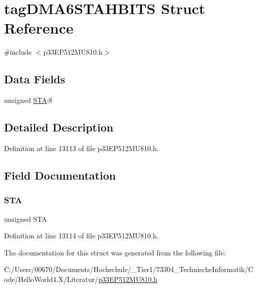 \hypertarget{structtag_d_m_a6_s_t_a_h_b_i_t_s}{}\section{tag\+D\+M\+A6\+S\+T\+A\+H\+B\+I\+TS Struct Reference}
\label{structtag_d_m_a6_s_t_a_h_b_i_t_s}


{\ttfamily \#include $<$p33\+E\+P512\+M\+U810.\+h$>$}

\subsection*{Data Fields}
\begin{DoxyCompactItemize}
\item 
unsigned \hyperlink{structtag_d_m_a6_s_t_a_h_b_i_t_s_a0eec78ddd2c12af678d5fab70fe62d14}{S\+TA}\+:8
\end{DoxyCompactItemize}


\subsection{Detailed Description}


Definition at line 13113 of file p33\+E\+P512\+M\+U810.\+h.



\subsection{Field Documentation}
\mbox{\label{structtag_d_m_a6_s_t_a_h_b_i_t_s_a0eec78ddd2c12af678d5fab70fe62d14}} 
\subsubsection{\texorpdfstring{S\+TA}{STA}}
{\footnotesize\ttfamily unsigned S\+TA}



Definition at line 13114 of file p33\+E\+P512\+M\+U810.\+h.



The documentation for this struct was generated from the following file\+:\begin{DoxyCompactItemize}
\item 
C\+:/\+Users/00670/\+Documents/\+Hochschule/\+\_\+\+Tier1/73304\+\_\+\+Technische\+Informatik/\+Code/\+Hello\+World4.\+X/\+Literatur/\hyperlink{p33_e_p512_m_u810_8h}{p33\+E\+P512\+M\+U810.\+h}\end{DoxyCompactItemize}
